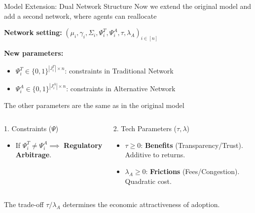\documentclass[aspectratio=169]{beamer}
\begin{document}
\begin{frame}{Model Extension: Dual Network Structure}
Now we extend the original model and add a second network, where agents can reallocate

\vspace{0.3cm}
\textbf{Network setting:} $(\mu_i, \gamma_i, \Sigma_i, \Psi_i^T, \Psi_i^A, \tau, \lambda_A)_{i \in [n]}$

\vspace{0.3cm}
\textbf{New parameters:}
\begin{itemize}
   \item $\Psi_i^T \in \{0,1\}^{|J_i^T| \times n}$: constraints in Traditional Network
   \item $\Psi_i^A \in \{0,1\}^{|J_i^A| \times n}$: constraints in Alternative Network
\end{itemize}
The other parameters are the same as in the original model
\begin{columns}[T]
        \begin{block}{1. Constraints ($\Psi$)}
            \begin{itemize}
                \item If $\Psi_i^T \neq \Psi_i^A \implies$ \textcolor{OrangeAccent}{\textbf{Regulatory Arbitrage}}.
            \end{itemize}
        \end{block}
        
        \begin{block}{2. Tech Parameters ($\tau, \lambda$)}
            \begin{itemize}
                \item $\tau \geq 0$: \textcolor{SafeGreen}{\textbf{Benefits}} (Transparency/Trust). Additive to returns.
                \item $\lambda_A \geq 0$: \textcolor{AlertRed}{\textbf{Frictions}} (Fees/Congestion). Quadratic cost.
            \end{itemize}
        \end{block}
    \end{columns}
    
    \vspace{0.2cm}
    \centering
    \footnotesize{The trade-off $\tau / \lambda_A$ determines the economic attractiveness of adoption.}
\end{frame}
\end{document}

